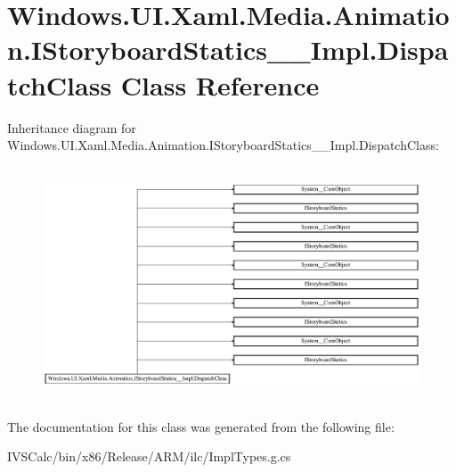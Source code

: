 \hypertarget{class_windows_1_1_u_i_1_1_xaml_1_1_media_1_1_animation_1_1_i_storyboard_statics_____impl_1_1_dispatch_class}{}\section{Windows.\+U\+I.\+Xaml.\+Media.\+Animation.\+I\+Storyboard\+Statics\+\_\+\+\_\+\+Impl.\+Dispatch\+Class Class Reference}
\label{class_windows_1_1_u_i_1_1_xaml_1_1_media_1_1_animation_1_1_i_storyboard_statics_____impl_1_1_dispatch_class}
Inheritance diagram for Windows.\+U\+I.\+Xaml.\+Media.\+Animation.\+I\+Storyboard\+Statics\+\_\+\+\_\+\+Impl.\+Dispatch\+Class\+:\begin{figure}[H]
\begin{center}
\leavevmode
\includegraphics[height=6.968326cm]{class_windows_1_1_u_i_1_1_xaml_1_1_media_1_1_animation_1_1_i_storyboard_statics_____impl_1_1_dispatch_class}
\end{center}
\end{figure}


The documentation for this class was generated from the following file\+:\begin{DoxyCompactItemize}
\item 
I\+V\+S\+Calc/bin/x86/\+Release/\+A\+R\+M/ilc/Impl\+Types.\+g.\+cs\end{DoxyCompactItemize}
